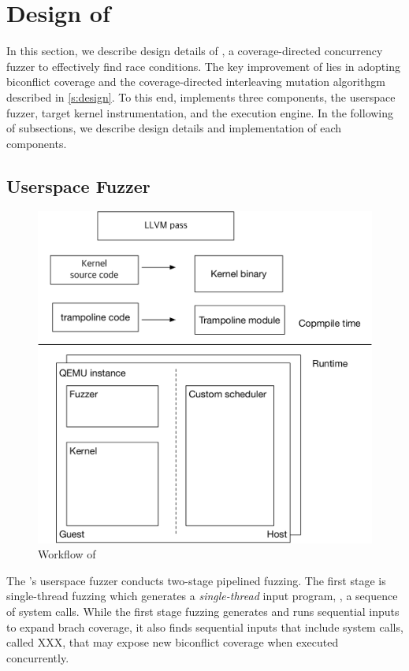 \section{Design of \sys}
\label{s:impl}


In this section, we describe design details of \sys, a
coverage-directed concurrency fuzzer to effectively find race
conditions.
%
The key improvement of \sys lies in adopting biconflict coverage and
the coverage-directed interleaving mutation algorithgm described in
\autoref{s:design}.
%
To this end, \sys implements three components, the userspace fuzzer,
target kernel instrumentation, and the execution engine.
%
In the following of subsections, we describe design details and
implementation of each components.


\subsection{Userspace Fuzzer}
\label{ss:fuzzer}



\begin{figure}
  \includegraphics[width=0.9\linewidth]{fig/architecture.pdf}
  \caption{Workflow of \sys}
  \label{fig:workflow}
\end{figure}


The \sys's userspace fuzzer conducts two-stage pipelined fuzzing.
%
The first stage is single-thread fuzzing which generates a
\textit{single-thread} input program, \ie, a sequence of system calls.
%
While the first stage fuzzing generates and runs sequential inputs to
expand brach coverage, it also finds sequential inputs that include
system calls, called XXX, that may expose new biconflict coverage when
executed concurrently.

